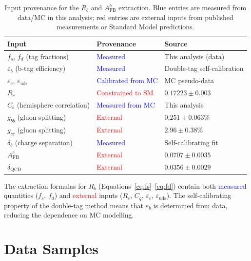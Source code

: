 \documentclass[11pt,a4paper]{article}
\newcommand{\measured}[1]{\textcolor{blue}{#1}}
\newcommand{\external}[1]{\textcolor{red}{#1}}
\begin{document}
\begin{table}[htbp]
\centering
\caption{Input provenance for the $R_b$ and $A_\mathrm{FB}^b$ extraction.
Blue entries are measured from data/MC in this analysis; red entries are
external inputs from published measurements or Standard Model predictions.}
\label{tab:input_provenance}
\small
\begin{tabular}{lll}
\toprule
Input & Provenance & Source \\
\midrule
$f_s$, $f_d$ (tag fractions) & \measured{Measured} & This analysis (data) \\
$\varepsilon_b$ (b-tag efficiency) & \measured{Measured} & Double-tag self-calibration \\
$\varepsilon_c$, $\varepsilon_\mathrm{uds}$ & \measured{Calibrated from MC} & MC pseudo-data \\
$R_c$ & \external{Constrained to SM} & $0.17223 \pm 0.003$~\cite{LEP:EWWG:2005} \\
$C_b$ (hemisphere correlation) & \measured{Measured from MC} & This analysis \\
$g_{b\bar{b}}$ (gluon splitting) & \external{External} & $0.251 \pm 0.063\%$~\cite{LEP:HF:2001} \\
$g_{c\bar{c}}$ (gluon splitting) & \external{External} & $2.96 \pm 0.38\%$~\cite{LEP:gcc} \\
$\delta_b$ (charge separation) & \measured{Measured} & Self-calibrating fit \\
$A_\mathrm{FB}^c$ & \external{External} & $0.0707 \pm 0.0035$~\cite{LEP:EWWG:2005} \\
$\delta_\mathrm{QCD}$ & \external{External} & $0.0356 \pm 0.0029$~\cite{LEP:EWWG:2005} \\
\bottomrule
\end{tabular}
\end{table}

The extraction formulas for $R_b$ (Equations~\ref{eq:fs}--\ref{eq:fd}) contain both
\measured{measured} quantities ($f_s$, $f_d$) and \external{external} inputs
($R_c$, $C_q$, $\varepsilon_c$, $\varepsilon_\mathrm{uds}$). The self-calibrating
property of the double-tag method means that $\varepsilon_b$ is determined from data,
reducing the dependence on MC modelling.

\FloatBarrier
{}
\section{Data Samples}
\label{sec:data}
\end{document}
